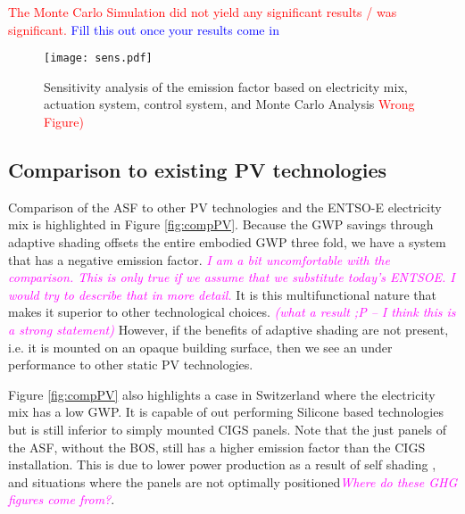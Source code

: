 \textcolor{red}{The Monte Carlo Simulation did not yield any significant results / was significant. } \textcolor{blue}{Fill this out once your results come in}




\begin{figure}[H]
\begin{center}
\texttt{[image: sens.pdf]}
\caption{Sensitivity analysis of the emission factor based on electricity mix, actuation system, control system, and Monte Carlo Analysis \textcolor{red}{Wrong Figure)}}
\label{fig:sens}
\end{center}
\end{figure}



\subsection{Comparison to existing PV technologies}

Comparison of the ASF to other PV technologies and the ENTSO-E electricity mix is highlighted in Figure \ref{fig:compPV}. Because the GWP savings through adaptive shading offsets the entire embodied GWP three fold, we have a system that has a negative emission factor. \textcolor{magenta}{\textit{I am a bit uncomfortable with the comparison. This is only true if we assume that we substitute today's ENTSOE. I would try to describe that in more detail.}} It is this multifunctional nature that makes it superior to other technological choices. \textcolor{magenta}{\textit{(what a result ;P -- I think this is a strong statement)}} However, if the benefits of adaptive shading are not present, i.e. it is mounted on an opaque building surface, then we see an under performance to other static PV technologies. 

Figure \ref{fig:compPV} also highlights a case in Switzerland where the electricity mix has a low GWP. It is capable of out performing Silicone based technologies but is still inferior to simply mounted CIGS panels. Note that the just panels of the ASF, without the BOS, still has a higher emission factor than the CIGS installation. This is due to lower power production as a result of self shading \cite{hofer2015photovoltaics}, and situations where the panels are not optimally positioned\textcolor{magenta}{\textit{Where do these GHG figures come from?}}.

